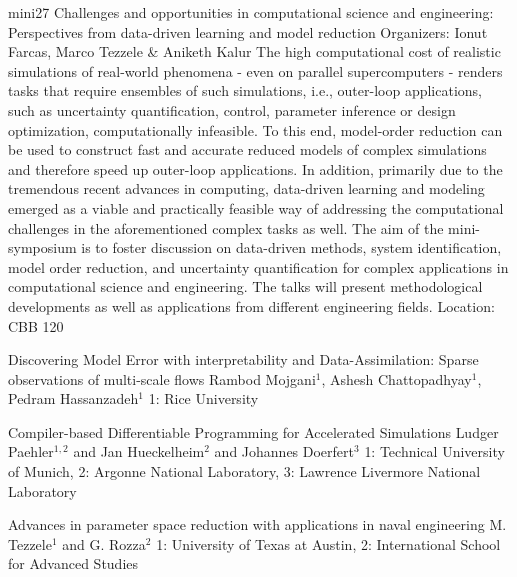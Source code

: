 \mini
{mini27}
{Challenges and opportunities in computational science and engineering: Perspectives from data-driven learning and model reduction}
{Organizers: Ionut Farcas, Marco Tezzele \& Aniketh Kalur}
{The high computational cost of realistic simulations of real-world phenomena - even on parallel supercomputers - renders tasks that require ensembles of such simulations, i.e., outer-loop applications, such as uncertainty quantification, control, parameter inference or design optimization, computationally infeasible. To this end, model-order reduction can be used to construct fast and accurate reduced models of complex simulations and therefore speed up outer-loop applications. In addition, primarily due to the tremendous recent advances in computing, data-driven learning and modeling emerged as a viable and practically feasible way of addressing the computational challenges in the aforementioned complex tasks as well. The aim of the mini-symposium is to foster discussion on data-driven methods, system identification, model order reduction, and uncertainty quantification for complex applications in computational science and engineering. The talks will present methodological developments as well as applications from different engineering fields.}
{Location: CBB 120}

\begin{talks}
\item\talk
{Discovering Model Error with interpretability and Data-Assimilation: Sparse observations of multi-scale flows}
{Rambod Mojgani$^{1}$, Ashesh Chattopadhyay$^{1}$, Pedram Hassanzadeh$^{1}$}
{1: Rice University}
\item\talk
{Compiler-based Differentiable Programming for Accelerated Simulations}
{Ludger Paehler$^{1,2}$ and Jan Hueckelheim$^{2}$ and Johannes Doerfert$^{3}$}
{1: Technical University of Munich, 2: Argonne National Laboratory, 3: Lawrence Livermore National Laboratory}
\item\talk
{Advances in parameter space reduction with applications in naval engineering}
{M. Tezzele$^{1}$ and G. Rozza$^{2}$}
{1: University of Texas at Austin, 2: International School for Advanced Studies}
\end{talks}
\room
